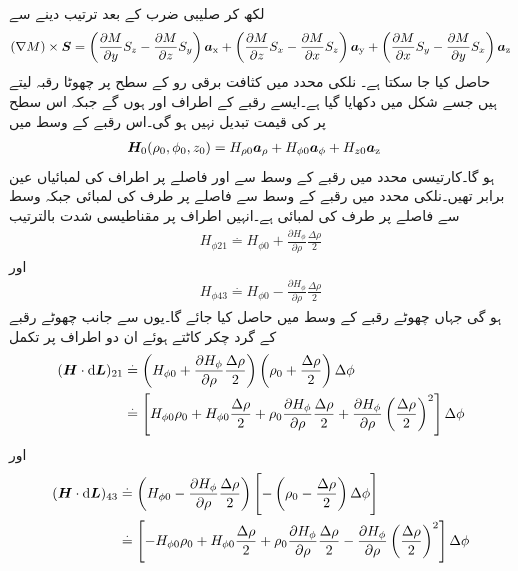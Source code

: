 لکھ کر صلیبی ضرب کے بعد ترتیب دینے سے
\begin{align*}
\left(\nabla M\right) \times {\ensuremath{{\boldsymbol{S}}}}=\left(\frac{\partial M}{\partial y}S_z-\frac{\partial M}{\partial z}S_y\right){\boldsymbol{a}}_{\textup{x}}+\left( \frac{\partial M}{\partial z}S_x-\frac{\partial M}{\partial x}S_z\right){\boldsymbol{a}}_{\textup{y}}+\left(\frac{\partial M}{\partial x}S_y-\frac{\partial M}{\partial y}S_x\right){\boldsymbol{a}}_{\textup{z}}
\end{align*}
حاصل کیا جا سکتا ہے۔
نلکی محدد میں  کثافت برقی رو کے   سطح پر چھوٹا رقبہ لیتے ہیں جسے شکل  میں دکھایا گیا ہے۔ایسے رقبے کے اطراف  اور  ہوں گے جبکہ اس سطح پر  کی قیمت تبدیل نہیں ہو گی۔اس رقبے کے وسط میں
\begin{align*}
{\ensuremath{{\boldsymbol{H}}}}_0(\rho_0,\phi_0,z_0)&=H_{\rho 0}{\boldsymbol{a}}_{\rho}+H_{\phi 0}{\boldsymbol{a}}_{\phi}+H_{z 0}{\boldsymbol{a}}_{\textup{z}}
\end{align*}
ہو گا۔کارتیسی محدد میں رقبے کے وسط سے  اور  فاصلے پر اطراف کی لمبائیاں عین برابر تھیں۔نلکی محدد میں رقبے کے وسط سے  فاصلے پر طرف کی لمبائی  جبکہ  وسط سے  فاصلے پر طرف کی لمبائی  ہے۔انہیں اطراف پر مقناطیسی شدت  بالترتیب
\begin{align*}
H_{\phi 21}\overset{.}{=}H_{\phi 0}+\frac{\partial H_\phi}{\partial \rho}\frac{\Delta \rho}{2}
\end{align*}
اور
\begin{align*}
H_{\phi 43}\overset{.}{=}H_{\phi 0}-\frac{\partial H_\phi}{\partial \rho}\frac{\Delta \rho}{2}
\end{align*}
ہو گی جہاں  چھوٹے رقبے کے وسط میں حاصل کیا جائے گا۔یوں  سے  جانب چھوٹے رقبے کے گرد چکر کاٹتے ہوئے ان دو اطراف پر تکمل
\begin{align*}
(\kvec{H} \cdot \dif \kvec{L})_{21}&\overset{.}{=}\left(H_{\phi 0}+\frac{\partial H_\phi}{\partial \rho}\frac{\Delta \rho}{2} \right)\left(\rho_0 +\frac{\Delta \rho}{2} \right)\Delta \phi\\
&\overset{.}{=}\left[H_{\phi 0} \rho_0+H_{\phi 0} \frac{\Delta \rho}{2}+\rho_0 \frac{\partial H_\phi}{\partial \rho}\frac{\Delta \rho}{2}+\frac{\partial H_\phi}{\partial \rho} \left(\frac{\Delta \rho}{2} \right)^2\right]\Delta \phi
\end{align*}
اور
\begin{align*}
(\kvec{H} \cdot \dif \kvec{L})_{43}&\overset{.}{=}\left(H_{\phi 0}-\frac{\partial H_\phi}{\partial \rho}\frac{\Delta \rho}{2} \right)\left[-\left(\rho_0 -\frac{\Delta \rho}{2} \right)\Delta \phi\right]\\
&\overset{.}{=}\left[-H_{\phi 0} \rho_0+H_{\phi 0} \frac{\Delta \rho}{2}+\rho_0 \frac{\partial H_\phi}{\partial \rho}\frac{\Delta \rho}{2}-\frac{\partial H_\phi}{\partial \rho} \left(\frac{\Delta \rho}{2} \right)^2\right]\Delta \phi
\end{align*}
